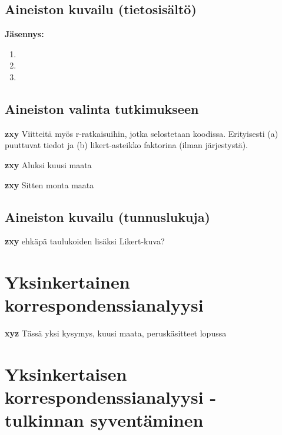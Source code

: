\documentclass[finnish,]{book}
\begin{document}
\hypertarget{aineiston-kuvailu-tietosisalto}{%
\section{Aineiston kuvailu
(tietosisältö)}\label{aineiston-kuvailu-tietosisalto}}

\textbf{Jäsennys:}

\begin{enumerate}
\def\labelenumi{\arabic{enumi}.}
\item
\item
\item
\end{enumerate}

\hypertarget{aineiston-valinta-tutkimukseen}{%
\section{Aineiston valinta
tutkimukseen}\label{aineiston-valinta-tutkimukseen}}

\textbf{zxy} Viitteitä myös r-ratkaisuihin, jotka selostetaan koodissa.
Erityisesti (a) puuttuvat tiedot ja (b) likert-asteikko faktorina (ilman
järjestystä).

\textbf{zxy} Aluksi kuusi maata

\textbf{zxy} Sitten monta maata

\hypertarget{aineiston-kuvailu-tunnuslukuja}{%
\section{Aineiston kuvailu
(tunnuslukuja)}\label{aineiston-kuvailu-tunnuslukuja}}

\textbf{zxy} ehkäpä taulukoiden lisäksi Likert-kuva?

\hypertarget{yksinkertainen-korrespondenssianalyysi}{%
\chapter{Yksinkertainen
korrespondenssianalyysi}\label{yksinkertainen-korrespondenssianalyysi}}

\textbf{xyz} Tässä yksi kysymys, kuusi maata, peruskäsitteet lopussa

\hypertarget{yksinkertaisen-korrespondenssianalyysi---tulkinnan-syventaminen}{%
\chapter{Yksinkertaisen korrespondenssianalyysi - tulkinnan
syventäminen}\label{yksinkertaisen-korrespondenssianalyysi---tulkinnan-syventaminen}}
\end{document}
